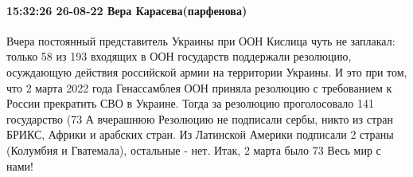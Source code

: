  
 
 
 
 

\paragraph{15:32:26 26-08-22 Вера Карасева(парфенова)}

Вчера постоянный представитель Украины при ООН Кислица чуть не заплакал: только 58 из 193 входящих в ООН государств поддержали резолюцию, осуждающую действия российской армии на территории Украины.
И это при том, что 2 марта 2022 года Генассамблея ООН приняла резолюцию с требованием к России прекратить СВО в Украине. Тогда за резолюцию проголосовало 141 государство (73 %
А вчерашнюю Резолюцию не подписали сербы, никто из стран БРИКС, Африки и арабских стран. Из Латинской Америки подписали 2 страны (Колумбия и Гватемала), остальные - нет.
Итак, 2 марта было 73%
Весь мир с нами!
